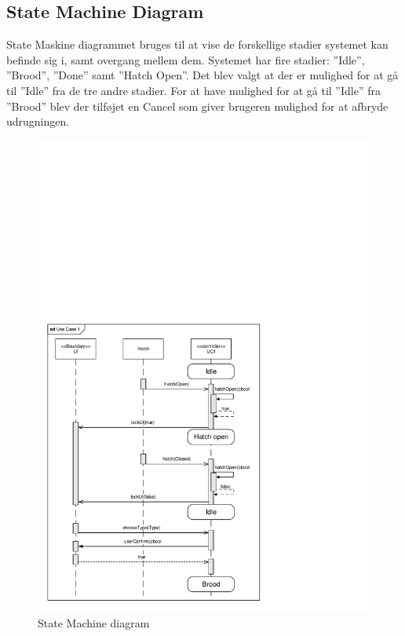 
\subsection{State Machine Diagram}

State Maskine diagrammet bruges til at vise de forskellige stadier systemet kan befinde sig i, samt overgang mellem dem. Systemet har fire stadier: ”Idle”, ”Brood”, ”Done” samt ”Hatch Open”.  Det blev valgt at der er mulighed for at gå til ”Idle” fra de tre andre stadier. For at have mulighed for at gå til ”Idle” fra ”Brood” blev der tilføjet en Cancel som giver brugeren mulighed for at afbryde udrugningen.

\begin{figure}[H]
\centering
\includegraphics[page=3,width=\linewidth,viewport=8mm 8mm 171mm 103mm]{./2_systemarkitektur/diagrammer/ArkitekturDiagrammer.pdf}
\caption[Diagram]{State Machine diagram}
\label{fig:SystemStateDiagram}
\end{figure}
